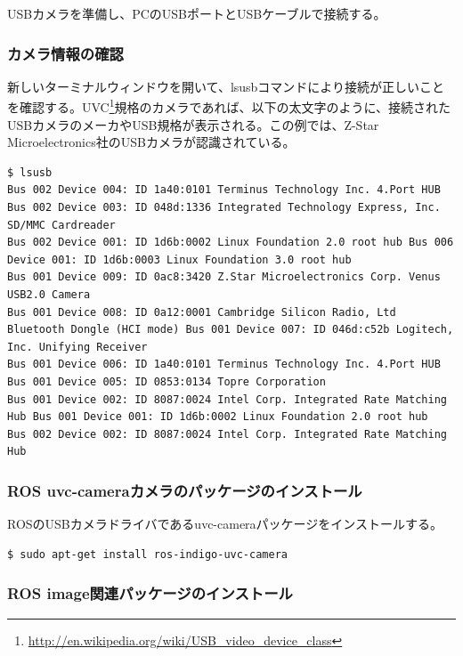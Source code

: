 USBカメラを準備し、PCのUSBポートとUSBケーブルで接続する。

\subsubsection{カメラ情報の確認}

新しいターミナルウィンドウを開いて、lsusbコマンドにより接続が正しいことを確認する。UVC\footnote{\url{http://en.wikipedia.org/wiki/USB\_video\_device\_class}}規格のカメラであれば、以下の太文字のように、接続されたUSBカメラのメーカやUSB規格が表示される。この例では、Z-Star Microelectronics社のUSBカメラが認識されている。

\begin{lstlisting}[language=ROS]
$ lsusb
Bus 002 Device 004: ID 1a40:0101 Terminus Technology Inc. 4.Port HUB
Bus 002 Device 003: ID 048d:1336 Integrated Technology Express, Inc. SD/MMC Cardreader
Bus 002 Device 001: ID 1d6b:0002 Linux Foundation 2.0 root hub Bus 006 Device 001: ID 1d6b:0003 Linux Foundation 3.0 root hub
Bus 001 Device 009: ID 0ac8:3420 Z.Star Microelectronics Corp. Venus USB2.0 Camera
Bus 001 Device 008: ID 0a12:0001 Cambridge Silicon Radio, Ltd Bluetooth Dongle (HCI mode) Bus 001 Device 007: ID 046d:c52b Logitech, Inc. Unifying Receiver
Bus 001 Device 006: ID 1a40:0101 Terminus Technology Inc. 4.Port HUB Bus 001 Device 005: ID 0853:0134 Topre Corporation
Bus 001 Device 002: ID 8087:0024 Intel Corp. Integrated Rate Matching Hub Bus 001 Device 001: ID 1d6b:0002 Linux Foundation 2.0 root hub
Bus 002 Device 002: ID 8087:0024 Intel Corp. Integrated Rate Matching Hub
\end{lstlisting}

\subsubsection{ROS uvc-cameraカメラのパッケージのインストール}

ROSのUSBカメラドライバであるuvc-cameraパッケージをインストールする。

\begin{lstlisting}[language=ROS]
$ sudo apt-get install ros-indigo-uvc-camera
\end{lstlisting}

\subsubsection{ROS image関連パッケージのインストール}

